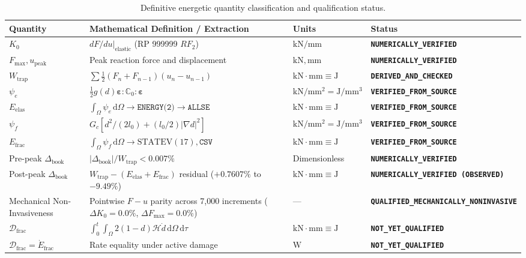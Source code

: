 \begin{table}[htbp]
\centering
\caption{Definitive energetic quantity classification and qualification status.}
\label{tab:energy_qualification_status}
\fontsize{7.5}{9.0}\selectfont
\begin{tabularx}{\textwidth}{lXll}
\toprule
\textbf{Quantity} & \textbf{Mathematical Definition / Extraction} & \textbf{Units} & \textbf{Status} \\
\midrule
$K_0$ & $dF/du|_{\text{elastic}}$ (RP 999999 $RF_2$) & $\mathrm{kN/mm}$ & \textbf{\texttt{NUMERICALLY\_VERIFIED}} \\
$F_{\max}, u_{\mathrm{peak}}$ & Peak reaction force and displacement & $\mathrm{kN}, \mathrm{mm}$ & \textbf{\texttt{NUMERICALLY\_VERIFIED}} \\
$W_{\mathrm{trap}}$ & $\sum \frac{1}{2}(F_n+F_{n-1})(u_n-u_{n-1})$ & $\mathrm{kN\cdot mm} \equiv \mathrm{J}$ & \textbf{\texttt{DERIVED\_AND\_CHECKED}} \\
$\psi_e$ & $\frac{1}{2}g(d)\boldsymbol{\varepsilon}:\mathbb{C}_0:\boldsymbol{\varepsilon}$ & $\mathrm{kN/mm^2} = \mathrm{J/mm^3}$ & \textbf{\texttt{VERIFIED\_FROM\_SOURCE}} \\
$E_{\mathrm{elas}}$ & $\int_{\Omega} \psi_e\,\mathrm{d}\Omega \to \texttt{ENERGY(2)} \to \texttt{ALLSE}$ & $\mathrm{kN\cdot mm} \equiv \mathrm{J}$ & \textbf{\texttt{VERIFIED\_FROM\_SOURCE}} \\
$\psi_f$ & $G_c [ d^2/(2l_0) + (l_0/2)|\nabla d|^2 ]$ & $\mathrm{kN/mm^2} = \mathrm{J/mm^3}$ & \textbf{\texttt{VERIFIED\_FROM\_SOURCE}} \\
$E_{\mathrm{frac}}$ & $\int_{\Omega} \psi_f\,\mathrm{d}\Omega \to \mathrm{STATEV}(17), \texttt{CSV}$ & $\mathrm{kN\cdot mm} \equiv \mathrm{J}$ & \textbf{\texttt{VERIFIED\_FROM\_SOURCE}} \\
Pre-peak $\Delta_{\mathrm{book}}$ & $|\Delta_{\mathrm{book}}| / W_{\mathrm{trap}} < 0.007\%$ & Dimensionless & \textbf{\texttt{NUMERICALLY\_VERIFIED}} \\
Post-peak $\Delta_{\mathrm{book}}$ & $W_{\mathrm{trap}} - (E_{\mathrm{elas}}+E_{\mathrm{frac}})$ residual ($+0.7607\%$ to $-9.49\%$) & $\mathrm{kN\cdot mm} \equiv \mathrm{J}$ & \textbf{\texttt{NUMERICALLY\_VERIFIED (OBSERVED)}} \\
Mechanical Non-Invasiveness & Pointwise $F-u$ parity across 7,000 increments ($\Delta K_0=0.0\%$, $\Delta F_{\max}=0.0\%$) & — & \textbf{\texttt{QUALIFIED\_MECHANICALLY\_NONINVASIVE}} \\
$\mathcal{D}_{\mathrm{frac}}$ & $\int_0^t \int_{\Omega} 2(1-d)\mathcal{H}\dot{d}\,\mathrm{d}\Omega\,\mathrm{d}\tau$ & $\mathrm{kN\cdot mm} \equiv \mathrm{J}$ & \textbf{\texttt{NOT\_YET\_QUALIFIED}} \\
$\mathcal{D}_{\mathrm{frac}} = \dot{E}_{\mathrm{frac}}$ & Rate equality under active damage & $\mathrm{W}$ & \textbf{\texttt{NOT\_YET\_QUALIFIED}} \\
\bottomrule
\end{tabularx}
\end{table}
